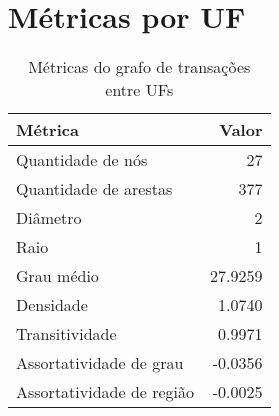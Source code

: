 
\section{Métricas por UF}

\begin{table}[htb]
\centering
\caption{Métricas do grafo de transações entre UFs}
\label{tab:metricas-redes:grafo-por-uf}
    \begin{tabular}{l|r}
    \toprule
    Métrica &  Valor \\
    \midrule
    Quantidade de nós         &  27      \\
    Quantidade de arestas     & 377      \\
    Diâmetro                  &   2      \\
    Raio                      &   1      \\
    Grau médio                &  27.9259 \\
    Densidade                 &   1.0740 \\
    Transitividade            &   0.9971 \\
    Assortatividade de grau   &  -0.0356 \\
    Assortatividade de região &  -0.0025 \\
    \bottomrule
    \end{tabular}
\fdadospesquisa
\end{table}

